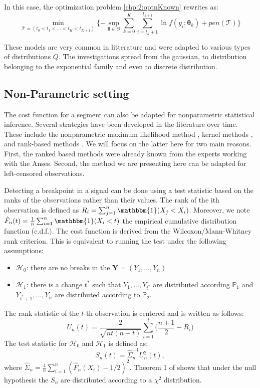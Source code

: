 In this case, the optimization problem \ref{chp:2:optnKnown} rewrites as: 
\begin{equation}\label{chp:2:penlik}
\min_{\mathcal{T} = (t_0 < t_1 < ... < t_K < t_{K+1})} \{ -\sup_{\bm \theta \in \Theta} \sum_{k=0}^K \sum_{i = t_k+1}^{t_{k+1}} \ln f(y_i; \bm \theta_k) + pen(\mathcal{T}) \} 
\end{equation}       

These models are very common in litterature and were adapted to various types of distributions $Q$. The investigations spread from the gaussian, to distribution belonging to the exponential family and even to discrete distribution. 

\subsection{Non-Parametric setting}\label{chp2:sec:multrank}

The cost function for a segment can also be adapted for nonparametric statistical inference. Several strategies have been developed in the literature over time. These include the nonparametric maximum likelihood method \cite{Zou2014,Einmahl2003}, kernel methods \cite{Harchaoui2008,li2015m}, and rank-based methods \cite{Pettitt1980,Wang2019}. We will focus on the latter here for two main reasons. First, the ranked based methods were already known from the experts working with the Anses. Second, the method we are presenting here can be adapted for left-censored observations.  

Detecting a breakpoint in a signal can be done using a test statistic based on the ranks of the observations rather than their values. The rank of the ith observation is defined as $R_i = \sum_{j =1}^n\mathbbm{1}(X_j < X_i)$. Moreover, we note $\hat{F}_n(t) = \frac{1}{n}\sum_{i = 1}^n\mathbbm{1}(X_i < t)$ the empirical cumulative distribution function (c.d.f.). The cost function is derived from the Wilcoxon/Mann-Whitney rank criterion. This is equivalent to running the test under the following assumptions: 
\begin{itemize}
  \item $\mathcal{H}_0$: there are no breaks in the $\bm Y = (Y_1,...,Y_n)$ 
  \item $\mathcal{H}_1$: there is a change $t^*$ such that $Y_1,...,Y_{t^*}$ are distributed according $\mathbb{P}_1$ and $Y_{t^*+1},...,Y_{n}$ are distributed according to $\mathbb{P}_2$. 
\end{itemize}
The rank statistic of the $t$-th observation is centered and is written as follows:
\begin{equation}\label{chp2:statranknp}
  U_n(t) = \frac{2}{\sqrt{nt(n-t)}}\sum_{i = 1}^{t}\bigg(\frac{n+1}{2} - R_i\bigg)
\end{equation}
The test statistic for $\mathcal{H}_0$ and $\mathcal{H}_1$ is defined as:
\begin{equation}\label{chp2:stattestnp}
  S_n(t) = \hat{\Sigma}_n^{-1} U^2_n(t),
\end{equation}
where $\hat{\Sigma}_n = \frac{4}{n}\sum_{i=1}^n(\hat{F}_n(X_i)-1/2)^2$. Theorem 1 of \cite{lung2015} shows that under the null hypothesis the $S_n$ are distributed according to a $\chi^2$ distribution.

